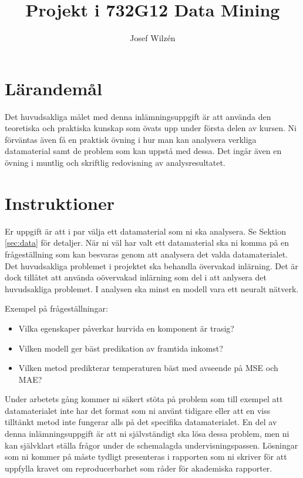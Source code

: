 \documentclass[a4paper]{article}
\title{Projekt i 732G12 Data Mining}
\author{Josef Wilzén}
\begin{document}
\maketitle
\thispagestyle{fancy}


\section{Lärandemål}

Det huvudsakliga målet med denna inlämningsuppgift är att använda den teoretiska och praktiska kunskap som övats upp under första delen av kursen. Ni förväntas även få en praktisk övning i hur man kan analysera verkliga datamaterial samt de problem som kan uppstå med dessa. Det ingår även en övning i muntlig och skriftlig redovisning av analysresultatet.

\section{Instruktioner}

Er uppgift är att i par välja ett datamaterial som ni ska analysera. Se Sektion \ref{sec:data} för detaljer. När ni väl har valt ett datamaterial ska ni komma på en frågeställning som kan besvaras genom att analysera det valda datamaterialet. Det huvudsakliga problemet i projektet ska behandla övervakad inlärning. Det är dock tillåtet att använda oövervakad inlärning som del i att anlysera det huvudsakliga problemet. I analysen ska minst en modell vara ett neuralt nätverk.

Exempel på frågeställningar:
\begin{itemize}
    \item Vilka egenskaper påverkar hurvida en komponent är trasig? 
    \item Vilken modell ger bäst predikation av framtida inkomst?
    \item Vilken metod predikterar temperaturen bäst med avseende på MSE och MAE?
\end{itemize}
Under arbetets gång kommer ni säkert stöta på problem som till exempel att datamaterialet inte har det format som ni använt tidigare eller att en viss tilltänkt metod inte fungerar alls på det specifika datamaterialet. En del av denna inlämningsuppgift är att ni självständigt ska lösa dessa problem, men ni kan självklart ställa frågor under de schemalagda undervisningspassen. Lösningar som ni kommer på måste tydligt presenteras i rapporten som ni skriver för att uppfylla kravet om reproducerbarhet som råder för akademiska rapporter.
\end{document}
